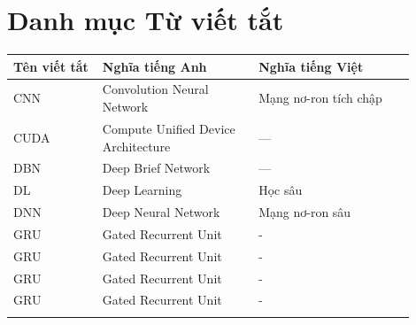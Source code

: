 
\chapter*{Danh mục Từ viết tắt}
\singlespacing

\begin{longtable}{p{0.2\linewidth} p{0.35\linewidth} p{0.35\linewidth}}
\toprule
\bfseries Tên viết tắt & \bfseries Nghĩa tiếng Anh & \bfseries Nghĩa tiếng Việt \\
\midrule
\endhead
\bottomrule
\endfoot
CNN & Convolution Neural Network & Mạng nơ-ron tích chập \\
\addlinespace
CUDA & Compute Unified Device Architecture &  --- \\
\addlinespace
DBN & Deep Brief Network &  --- \\
\addlinespace
DL & Deep Learning & Học sâu \\
\addlinespace
DNN & Deep Neural Network & Mạng nơ-ron sâu \\
\addlinespace
GRU & Gated Recurrent Unit &  -\\
\addlinespace
GRU & Gated Recurrent Unit &  -\\
\addlinespace
GRU & Gated Recurrent Unit &  -\\
\addlinespace
GRU & Gated Recurrent Unit & - \\
\addlinespace

\end{longtable}